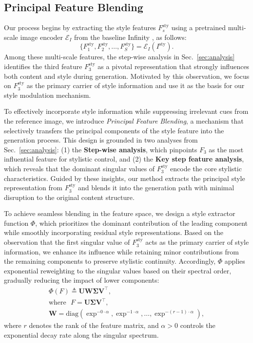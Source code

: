 \documentclass[10pt,twocolumn,letterpaper]{article}
\newcommand{\secref}[1]{Sec.~\ref{#1}}
\begin{document}
\subsection{Principal Feature Blending}
\label{sec:attnshare}

Our process begins by extracting the style features \({F}_{s}^\text{sty}\) using a pretrained multi-scale image encoder $\mathcal{E}_I$ from the baseline Infinity \cite{han2025infinity}, as follows:
\begin{equation}
	\{{F}_{1}^\text{sty}, {F}_{2}^\text{sty}, \dots, F_S^\text{sty}\} = \mathcal{E}_I(I^\text{sty}).
\end{equation}
Among these multi-scale features, the step-wise analysis in \secref{sec:analysis} identifies the third feature \({F}_{3}^\text{sty}\) as a pivotal representation that strongly influences both content and style during generation. 
Motivated by this observation, we focus on \({F}_{3}^\text{sty}\) as the primary carrier of style information and use it as the basis for our style modulation mechanism.

To effectively incorporate style information while suppressing irrelevant cues from the reference image, we introduce \textit{Principal Feature Blending}, a mechanism that selectively transfers the principal components of the style feature into the generation process. 
This design is grounded in two analyses from \secref{sec:analysis}:  
(1) the \textbf{Step-wise analysis}, which pinpoints \({F}_{3}\) as the most influential feature for stylistic control, and  
(2) the \textbf{Key step feature analysis}, which reveals that the dominant singular values of \({F}_3^\text{sty}\) encode the core stylistic characteristics.  
Guided by these insights, our method extracts the principal style representation from \({F}_3^\text{sty}\) and blends it into the generation path with minimal disruption to the original content structure.

To achieve seamless blending in the feature space, we design a style extractor function $\Phi$, which prioritizes the dominant contribution of the leading component while smoothly incorporating residual style representations. 
Based on the observation that the first singular value of $F_3^\text{sty}$ acts as the primary carrier of style information, we enhance its influence while retaining minor contributions from the remaining components to preserve stylistic continuity. 
Accordingly, $\Phi$ applies exponential reweighting to the singular values based on their spectral order, gradually reducing the impact of lower components:
\begin{equation}
	\begin{gathered}
		\Phi(F) \triangleq \mathbf{U W \Sigma V^\top}, \\
		\text{where~~} F = \mathbf{U \Sigma V^\top}, \\
		\mathbf{W} = \text{diag}(\exp^{-0 \cdot \alpha}, \exp^{-1 \cdot \alpha}, \dots, \exp^{-(r-1) \cdot \alpha}),
	\end{gathered}
\end{equation}
where $r$ denotes the rank of the feature matrix, and $\alpha>0$ controls the exponential decay rate along the singular spectrum. 
\end{document}
